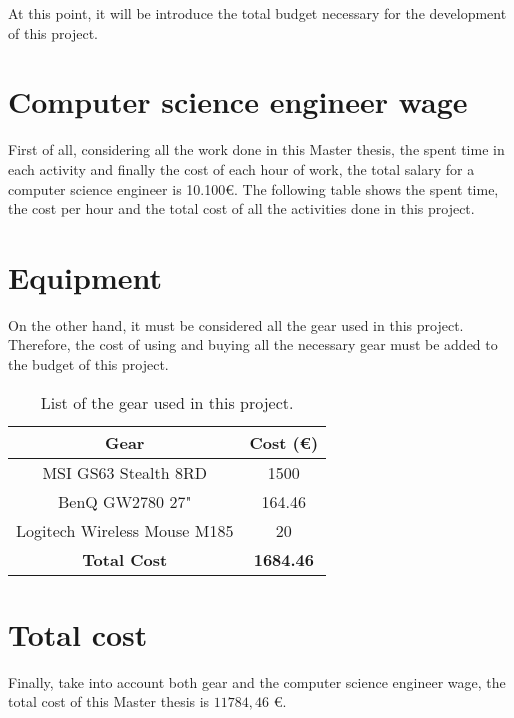 At this point, it will be introduce the total budget necessary for the development of this project.

\section{Computer science engineer wage}
First of all, considering all the work done in this Master thesis, the spent time in each activity and finally the cost of each hour of work, the total salary for a computer science engineer is 10.100\euro{}. The following table shows the spent time, the cost per hour and the total cost of all the activities done in this project.

\begin{table}[!h]
\centering
{}
\caption{Description of the work done and its cost.}
\label{my-label}
\end{table}

\newpage
\section{Equipment}
On the other hand, it must be considered all the gear used in this project. Therefore, the cost of using and buying all the necessary gear must be added to the budget of this project.
\begin{table}[!h]
\centering
\begin{tabular}{cc}
\hline
\multicolumn{1}{|c|}{\textbf{Gear}} & \multicolumn{1}{c|}{\textbf{Cost (\euro{})}} \\ \hline
\multicolumn{1}{|c|}{MSI GS63 Stealth 8RD} & \multicolumn{1}{c|}{1500} \\ \hline
\multicolumn{1}{|c|}{BenQ GW2780 27"} & \multicolumn{1}{c|}{164.46} \\ \hline
\multicolumn{1}{|c|}{Logitech Wireless Mouse M185} & \multicolumn{1}{c|}{20} \\ \hline
\textbf{Total Cost} & \textbf{1684.46}
\end{tabular}
\caption{List of the gear used in this project.}
\label{my-label}
\end{table}

\section{Total cost}
Finally, take into account both gear and the computer science engineer wage, the total cost of this Master thesis is $11784,46$ \euro{}.